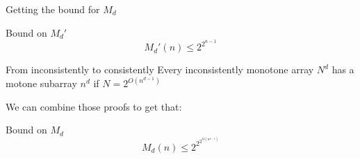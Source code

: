 
\begin{frame}{Getting the bound for \(M_d\)}
    \begin{theorem}{Bound on \(M_d'\)}
        \[M_d'(n)\leq 2^{2^{n-1}}\]
    \end{theorem}
    \begin{theorem}{From inconsistently to consistently}
        Every inconsistently monotone array \(N^d\) has a motone subarray \(n^d\) if \(N=2^{O(n^{d-1})}\)
    \end{theorem}
    \pause
    We can combine those proofs to get that:
    \begin{theorem}{Bound on \(M_d\)}
        \[M_d(n)\leq 2^{2^{2^{O(n^{d-1})}}}\]
    \end{theorem}
\end{frame}